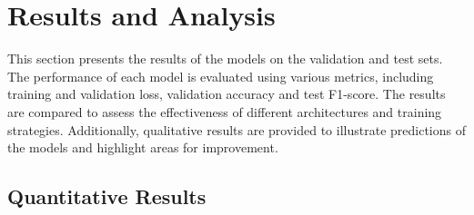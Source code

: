 \section{Results and Analysis}

This section presents the results of the models on the validation and test sets. The performance of each model is evaluated using various metrics, including training and validation loss, validation accuracy and test F1-score. The results are compared to assess the effectiveness of different architectures and training strategies. Additionally, qualitative results are provided to illustrate predictions of the models and highlight areas for improvement.

\subsection{Quantitative Results}

\begin{table}[htbp]
    \caption{Quantitative results of the models on the train, validation and test set.}
    \begin{center}
    \end{center}
\end{table}

